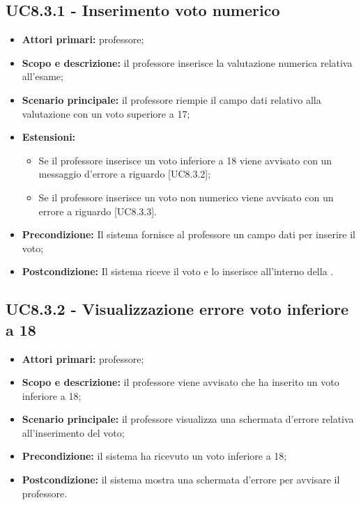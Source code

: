 \documentclass[AnalisiDeiRequisiti.tex]{subfiles}
\begin{document}
\subsection{UC8.3.1 - Inserimento voto numerico}
\begin{itemize}
	\item \textbf{Attori primari:} professore;
	\item \textbf{Scopo e descrizione:} il professore inserisce la valutazione numerica relativa all'esame;
	\item \textbf{Scenario principale:} il professore riempie il campo dati relativo alla valutazione con un voto superiore a 17;
	\item \textbf{Estensioni:}
	\begin{itemize}
		\item Se il professore inserisce un voto inferiore a 18 viene avvisato con un messaggio d'errore a riguardo [UC8.3.2];
		\item Se il professore inserisce un voto non numerico viene avvisato con un errore a riguardo [UC8.3.3].
	\end{itemize}
	\item \textbf{Precondizione:} Il sistema fornisce al professore un campo dati per inserire il voto; 
	\item \textbf{Postcondizione:} Il sistema riceve il voto e lo inserisce all'interno della .
\end{itemize}
\subsection{UC8.3.2 - Visualizzazione errore voto inferiore a 18}
\begin{itemize}
	\item \textbf{Attori primari:} professore;
	\item \textbf{Scopo e descrizione:} il professore viene avvisato che ha inserito un voto inferiore a 18;
	\item \textbf{Scenario principale:} il professore visualizza una schermata d'errore relativa all'inserimento del voto;
	\item \textbf{Precondizione:} il sistema ha ricevuto un voto inferiore a 18; 
	\item \textbf{Postcondizione:} il sistema mostra una schermata d'errore per avvisare il professore.
\end{itemize}
\end{document}

